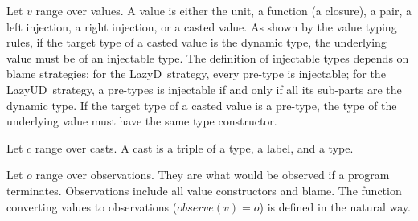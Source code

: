 \documentclass[acmsmall,review,anonymous]{acmart}\settopmatter{printfolios=true,printccs=false,printacmref=false}
\newcommand{\lazyUD}{Lazy\;UD}
\newcommand{\lazyD}{Lazy\;D}
\begin{document}
Let $ v $ range over values. A value is either the unit, a function (a
closure), a pair, a left injection, a right injection, or a casted
value. As shown by the value typing rules, if the target type of a
casted value is the dynamic type, the underlying value must be of an
injectable type. The definition of injectable types depends on blame
strategies: for the \lazyD\ strategy, every pre-type is injectable;
for the \lazyUD\ strategy, a pre-types is injectable if and only if
all its sub-parts are the dynamic type. If the target type of a casted
value is a pre-type, the type of the underlying value must have the
same type constructor.

Let $ c $ range over casts. A cast is a triple of a type, a label, and a type.

Let $ o $ range over observations. They are what would be observed if
a program terminates. Observations include all value constructors and
blame.  The function converting values to observations ($ observe(v) =
o $) is defined in the natural way.
\end{document}
